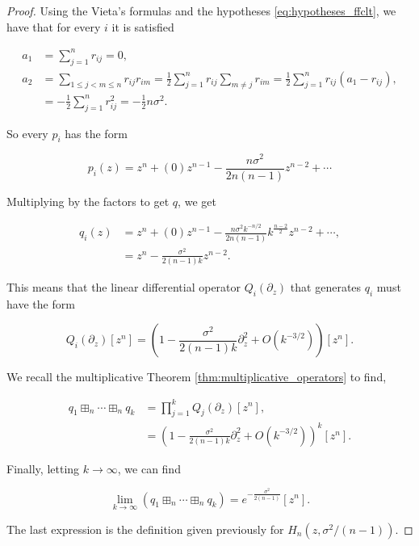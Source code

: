 \begin{proof}
    Using the Vieta's formulas and the hypotheses \eqref{eq:hypotheses_ffclt}, we have that for every $i$ it is satisfied

    \begin{align*}
        a_1 &= \sum_{j=1}^n r_{ij} = 0,\\
        a_2 &= \sum_{1 \le j < m \le n} r_{ij}r_{im} = \frac12 \sum_{j=1}^n r_{ij}\sum_{m\neq j} r_{im} = \frac12 \sum_{j=1}^n r_{ij} \left(a_1 - r_{ij}\right),\\
        &= - \frac12 \sum_{j=1}^n r_{ij}^2 = - \frac12 n\sigma^2.
    \end{align*}

    So every $p_i$ has the form

    \begin{equation*}
        p_i(z) = z^n + (0)z^{n-1} - \frac{n\sigma^2}{2n(n-1)} z^{n-2} + \cdots
    \end{equation*}

    Multiplying by the factors to get $q$, we get

    \begin{align*}
        q_i(z) &= z^n + (0)z^{n-1} - \frac{n\sigma^2k^{-n/2}}{2n(n-1)} k^{\frac{n-2}{2}}z^{n-2} + \cdots ,\\
        &= z^n - \frac{\sigma^2}{2(n-1)k}z^{n-2}.
    \end{align*}

    This means that the linear differential operator $Q_i(\partial_z)$ that generates $q_i$ must have the form

    \begin{equation*}
        Q_i(\partial_z)[z^n] = \left( 1 - \frac{\sigma^2}{2(n-1)k}\partial_z^2 + O(k^{-3/2})\right)[z^n].
    \end{equation*}

    We recall the multiplicative Theorem \ref{thm:multiplicative_operators} to find,

    \begin{align*}
        q_1 \boxplus_n \cdots \boxplus_n q_k &= \prod_{j=1}^k Q_j(\partial_z)[z^n], \\
        &= \left( 1 - \frac{\sigma^2}{2(n-1)k}\partial_z^2 + O(k^{-3/2})\right)^k[z^n].
    \end{align*}

    Finally, letting $k\to\infty$, we can find

    \begin{equation*}
        \lim_{k\to\infty} \left(q_1 \boxplus_n \cdots \boxplus_n q_k\right) = e^{ - \frac{\sigma^2}{2(n-1)} }[z^n].
    \end{equation*}

    The last expression is the definition given previously for $H_n(z,\sigma^2/(n-1))$.
\end{proof}


